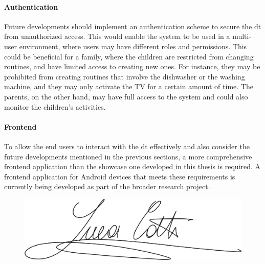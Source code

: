\paragraph{Authentication}

Future developments should implement an authentication scheme to secure the \acrshort{dt} from unauthorized access. This would enable the system to be used in a multi-user environment, where users may have different roles and permissions. This could be beneficial for a family, where the children are restricted from changing routines, and have limited access to creating new ones. For instance, they may be prohibited from creating routines that involve the dishwasher or the washing machine, and they may only activate the TV for a certain amount of time. The parents, on the other hand, may have full access to the system and could also monitor the children's activities.

\paragraph{Frontend}

To allow the end users to interact with the \acrshort{dt} effectively and also consider the future developments mentioned in the previous sections, a more comprehensive frontend application than the showcase one developed in this thesis is required. A frontend application for Android devices that meets these requirements is currently being developed as part of the broader research project.

\vspace*{\fill} %

\begin{figure}[h]
    \centering
    \includegraphics[width=.7\textwidth]{images/signature.png}
\end{figure}

\vspace*{16mm} %